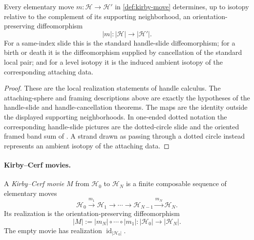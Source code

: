 \begin{proposition}
\label{prop:elementary-move-realization}
Every elementary move \(m\colon\mathcal H\to\mathcal H'\) in
\cref{def:kirby-move} determines, up to isotopy relative to the complement
of its supporting neighborhood, an orientation-preserving diffeomorphism
\[
  |m|\colon |\mathcal H|\longrightarrow|\mathcal H'|.
\]
For a same-index slide this is the standard handle-slide diffeomorphism; for
a birth or death it is the diffeomorphism supplied by cancellation of the
standard local pair; and for a level isotopy it is the induced ambient
isotopy of the corresponding attaching data.
\end{proposition}

\begin{proof}
These are the local realization statements of handle calculus.  The
attaching-sphere and framing descriptions above are exactly the hypotheses
of the handle-slide and handle-cancellation theorems.  The maps are the
identity outside the displayed supporting neighborhoods.  In one-ended
dotted notation the corresponding handle-slide pictures are the
dotted-circle slide and the oriented framed band sum of
\cite[Figures~5.39 and~5.36 and Section~5.1]{GompfStipsicz1999}.
A strand drawn as passing through a dotted circle instead represents an
ambient isotopy of the attaching data.
\end{proof}

\paragraph{Kirby--Cerf movies.}
A \emph{Kirby--Cerf movie} \(M\) from \(\mathcal H_0\) to
\(\mathcal H_N\) is a
finite composable sequence of elementary moves
\[
  \mathcal H_0\xrightarrow{m_1}\mathcal H_1
  \longrightarrow\cdots\longrightarrow
  \mathcal H_{N-1}\xrightarrow{m_N}\mathcal H_N.
\]
Its realization is the orientation-preserving diffeomorphism
\[
  |M|:=|m_N|\circ\cdots\circ|m_1|
  \colon|\mathcal H_0|\longrightarrow|\mathcal H_N|.
\]
The empty movie has realization \(\operatorname{id}_{|\mathcal H_0|}\).


